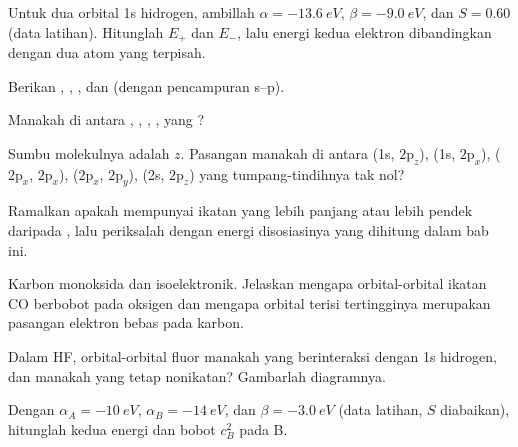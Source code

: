 \begin{exercise}[$\star$]\label{exo:b2:diatomic-mos:1}
Untuk dua orbital 1s hidrogen, ambillah $\alpha = \qty{-13.6}{eV}$,
$\beta = \qty{-9.0}{eV}$, dan $S = 0.60$ (data latihan). Hitunglah $E_+$ dan
$E_-$, lalu energi kedua elektron  dibandingkan dengan dua atom yang
terpisah.
\end{exercise}

\begin{exercise}[$\star$]\label{exo:b2:diatomic-mos:2}
Berikan  , , , dan  (dengan
pencampuran s--p).
\end{exercise}

\begin{exercise}[$\star$]\label{exo:b2:diatomic-mos:3}
Manakah di antara , , , ,  yang ?
\end{exercise}

\begin{exercise}[$\star$]\label{exo:b2:diatomic-mos:4}
Sumbu molekulnya adalah $z$. Pasangan manakah di antara (1s, $2\mathrm p_z$),
(1s, $2\mathrm p_x$), ($2\mathrm p_x$, $2\mathrm p_x$), ($2\mathrm p_x$,
$2\mathrm p_y$), (2s, $2\mathrm p_z$) yang tumpang-tindihnya tak nol?
\end{exercise}

\begin{exercise}[$\star\star$]\label{exo:b2:diatomic-mos:5}
Ramalkan apakah  mempunyai ikatan yang lebih panjang atau lebih
pendek daripada , lalu periksalah dengan energi disosiasinya yang
dihitung dalam bab ini.
\end{exercise}

\begin{exercise}[$\star\star$]\label{exo:b2:diatomic-mos:6}
Karbon monoksida dan  isoelektronik. Jelaskan mengapa
orbital-orbital ikatan CO berbobot pada oksigen dan mengapa orbital terisi
tertingginya merupakan pasangan elektron bebas pada karbon.
\end{exercise}

\begin{exercise}[$\star\star$]\label{exo:b2:diatomic-mos:7}
Dalam HF, orbital-orbital fluor manakah yang berinteraksi dengan 1s
hidrogen, dan manakah yang tetap nonikatan? Gambarlah diagramnya.
\end{exercise}

\begin{exercise}[$\star\star$]\label{exo:b2:diatomic-mos:8}
Dengan $\alpha_A = \qty{-10}{eV}$, $\alpha_B = \qty{-14}{eV}$, dan
$\beta = \qty{-3.0}{eV}$ (data latihan, $S$ diabaikan), hitunglah kedua
energi dan bobot $c_B^2$  pada B.
\end{exercise}


